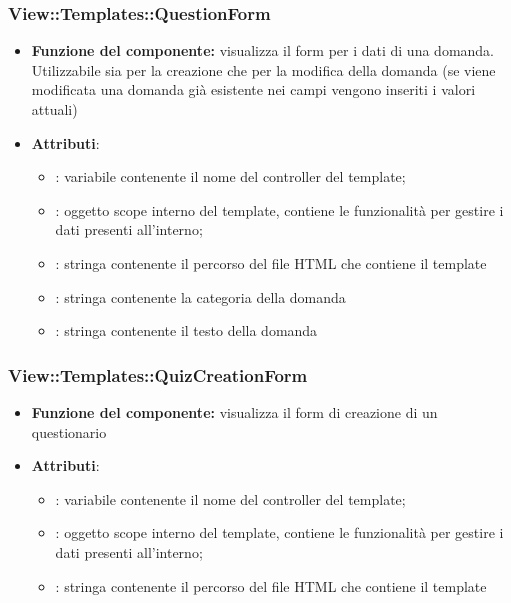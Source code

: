  \subsubsection{View::Templates::QuestionForm}
 \begin{itemize}
 \item\textbf{Funzione del componente:} visualizza il form per i dati di una domanda. Utilizzabile sia per la creazione che per la modifica della domanda (se viene modificata una domanda già esistente nei campi vengono inseriti i valori attuali)
 \item\textbf{Attributi}:
 	\begin{itemize}
 		\item{}: variabile contenente il nome del controller del template;\\
		\item{}: oggetto scope interno del template, contiene le funzionalità per gestire i dati presenti all’interno;\\
		\item{}: stringa contenente il percorso del file HTML che contiene il template\\
		\item{}: stringa contenente la categoria della domanda
		\item{}: stringa contenente il testo della domanda
 	\end{itemize}
 \end{itemize}
 
 \subsubsection{View::Templates::QuizCreationForm}
 \begin{itemize}
 \item\textbf{Funzione del componente:} visualizza il form di creazione di un questionario
 \item\textbf{Attributi}:
 	\begin{itemize}
 		\item{}: variabile contenente il nome del controller del template;\\
		\item{}: oggetto scope interno del template, contiene le funzionalità per gestire i dati presenti all’interno;\\
		\item{}: stringa contenente il percorso del file HTML che contiene il template\\
 	\end{itemize}
 \end{itemize}
 
